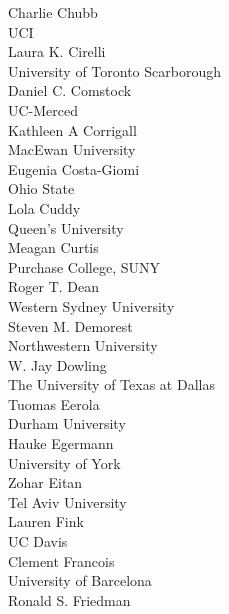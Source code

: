 \begin{multicols}{2}
Charlie Chubb\\
\vspace{.5em}UCI\\
Laura K. Cirelli\\
\vspace{.5em}University of Toronto Scarborough\\
Daniel C. Comstock\\
\vspace{.5em}UC-Merced\\
Kathleen A Corrigall\\
\vspace{.5em}MacEwan University\\
Eugenia Costa-Giomi\\
\vspace{.5em}Ohio State\\
Lola Cuddy\\
\vspace{.5em}Queen's University\\
Meagan Curtis\\
\vspace{.5em}Purchase College, SUNY\\
Roger T. Dean\\
\vspace{.5em}Western Sydney University\\
Steven M. Demorest\\
\vspace{.5em}Northwestern University\\
W. Jay Dowling\\
\vspace{.5em}The University of Texas at Dallas\\
Tuomas Eerola\\
\vspace{.5em}Durham University\\
Hauke Egermann\\
\vspace{.5em}University of York\\
Zohar Eitan\\
\vspace{.5em}Tel Aviv University\\
Lauren Fink\\
\vspace{.5em}UC Davis\\
Clement Francois\\
\vspace{.5em}University of Barcelona\\
Ronald S. Friedman\\

\end{multicols}
